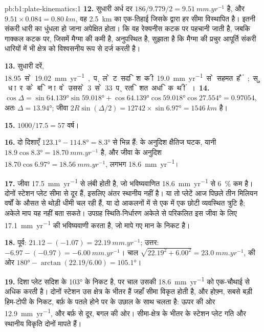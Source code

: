 \begin{solution}{pb:b1:plate-kinematics:1}
\textbf{12.} सुधारी अर्ध दर $186/9.779/2 = \qty{9.51}{mm.yr^{-1}}$ है,
और $9.51\times0.084 = \qty{0.80}{km}$, वह \qty{2.5}{km} का एक-तिहाई जिसके द्वारा हर सीमा विस्थापित है। इतनी संकरी धारी का धुंधला हो जाना अपेक्षित होता। कि वह रेक्यनीस कटक पर पहचानी जाती है, जबकि गाक्कल कटक पर, जिसमें मैग्मा की कमी है, अनुपस्थित है, सुझाता है कि मैग्मा की प्रचुर आपूर्ति संकरी धारियों में भी क्षेत्र को विश्वसनीय रूप से दर्ज करती है।

\textbf{13.} सुधारी दरें, \qty{18.95} से \qty{19.02}{mm.yr^{-1}}, प्लेट सदिश की \qty{19.0}{mm.yr^{-1}} से सहमत हैं; सुधार के बिना वे उससे 3 से 33 प्रतिशत अधिक थीं।

\textbf{14.} $\cos\Delta = \sin\ang{64.139}\sin\ang{59.018} +
\cos\ang{64.139}\cos\ang{59.018}\cos\ang{27.554} = 0.97054$, अतः $\Delta =
\ang{13.94}$; जीवा $2R\sin(\Delta/2) = 12742\times\sin\ang{6.97} =
\qty{1546}{km}$ है।

\textbf{15.} $1000/17.5 = 57$ वर्ष।

\textbf{16.} दो दिशाएँ $\ang{123.1} - \ang{114.8} =
\ang{8.3}$ से भिन्न हैं:  के अनुदिश क्षैतिज घटक, यानी
$18.9\cos\ang{8.3} = \qty{18.70}{mm.yr^{-1}}$ है, और जीवा के अनुदिश
$18.70\cos\ang{6.97} = \qty{18.56}{mm.yr^{-1}}$, लगभग \qty{18.6}{mm.yr^{-1}}।

\textbf{17.} जीवा \qty{17.5}{mm.yr^{-1}} से लंबी होती है, जो भविष्यवाणित \qty{18.6}{mm.yr^{-1}} से \qty{6}{\percent} कम है। दोनों स्टेशन प्लेट सीमा से दूर हैं, इसलिए अंतर स्थानीय नहीं है। या तो प्लेटें आज पिछले तीन मिलियन वर्षों के औसत से थोड़ी धीमी चल रही हैं, या दो आकलनों में से एक में एक छोटी व्यवस्थित त्रुटि है; अकेले माप यह नहीं बता सकते। उपग्रह स्थिति-निर्धारण अकेले से परिकलित  इस जीवा के लिए \qty{17.1}{mm.yr^{-1}} की भविष्यवाणी करता है, जो मापे गए मान के निकट है।

\textbf{18.} पूर्व: $21.12 - (-1.07) = \qty{22.19}{mm.yr^{-1}}$; उत्तर:
$-6.97 - (-0.97) = \qty{-6.00}{mm.yr^{-1}}$। चाल $\sqrt{22.19^2 + 6.00^2} =
\qty{23.0}{mm.yr^{-1}}$, की ओर $\ang{180} - \arctan(22.19/6.00) =
\ang{105.1}$।

\textbf{19.} दिशा प्लेट सदिश के \ang{103} के निकट है, पर चाल उसकी \qty{18.6}{mm.yr^{-1}} को एक-चौथाई से अधिक करती है। दोनों स्टेशन उस क्षेत्र के भीतर हैं जहाँ सीमा विकृत होती है, और होफ़्न, सबसे बड़ी हिम-टोपी के निकट, बर्फ़ के पतले होने पर  के उछाल के साथ चलता है: ऊपर की ओर \qty{12.9}{mm.yr^{-1}}, और बर्फ़ से दूर, बगल की ओर। सीमा-क्षेत्र के भीतर के स्टेशन प्लेट गति और स्थानीय विकृति दोनों मापते हैं।


\end{solution}
